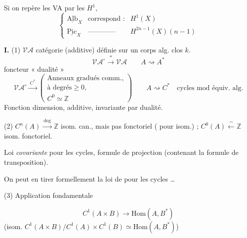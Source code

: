 \documentclass[11pt,a4paper]{article}
\begin{document}
Si on repère les VA par les $H^{1}$,
\[
  \left\{
  \begin{array}{lll}
    \underline{\mathrm{Alb}}_{X} & \text{correspond :} & H^{1}(X) \\
    \underline{\mathrm{Pic}}_{X} & \text{------------} & H^{2n-1}(X)(n-1)
  \end{array}
  \right.
\]


\textbf{I.} (1) $\mathcal{VA}$ catégorie (additive) définie \struck{\ill{}}  \struck{\ill{}} sur un corps alg. clos $k$.
\[
  \mathcal{VA}^{\circ} \xrightarrow{\ *\ } \mathcal{VA} \qquad A \rightsquigarrow A^{*}
\]
foncteur « dualité » \struck{\ill{}}
\[
  \mathcal{VA}^{\circ} \xrightarrow{\ C^{*}\ }
  \begin{pmatrix}
    \text{Anneaux gradués comm.,} \\
    \text{à degrés} \geqslant 0, \\
    C^{0} \simeq \mathbb{Z}
  \end{pmatrix}
  \qquad A \rightsquigarrow C^{*} \quad \text{cycles mod équiv. alg.}
\]
Fonction dimension, additive, invariante par dualité.

(2) $C^{n}(A) \xrightarrow{\ \deg\ } \mathbb{Z}$ isom. can., mais pas fonctoriel
( pour isom.) ; $C^{0}(A) \xleftarrow{\ \sim\ } \mathbb{Z}$ isom. fonctoriel.

Loi \emph{covariante} pour les cycles, formule de projection (contenant la formule de
transposition).

On peut en tirer formellement la loi de  pour les cycles …

(3) Application fondamentale


\[
  C^{1}(A \times B) \longrightarrow \mathrm{Hom}(A, B^{*})
\]
(isom. $C^{1}(A \times B)/C^{1}(A) \times C^{1}(B) \simeq \mathrm{Hom}(A, B^{*})$)
\end{document}
